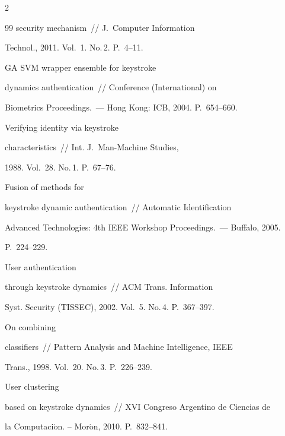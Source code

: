 \begin{multicols}{2}
{{\begin{thebibliography}{99}
security mechanism~// J.~Computer Information

Technol., 2011.  Vol.~1. No.\,2. P.~4--11.




 GA SVM  wrapper ensemble for keystroke

dynamics authentication~//  Conference (International) on

Biometrics Proceedings.~--- Hong Kong: ICB, 2004. P.~654--660.




 Verifying identity via keystroke

characteristics~// Int. J.~Man-Machine Studies,

1988. Vol.~28. No.\,1. P.~67--76.




 Fusion of methods for

keystroke dynamic authentication~// Automatic Identification

Advanced Technologies: 4th IEEE Workshop Proceedings.~--- Buffalo, 2005.

P.~224--229.




 User authentication

through keystroke dynamics~// ACM Trans. Information 

Syst. Security (TISSEC), 2002. Vol.~5. No.\,4. P.~367--397.




 On combining

classifiers~// Pattern Analysis and Machine Intelligence, IEEE

Trans., 1998. Vol.~20. No.\,3. P.~226--239.




 User clustering

based on keystroke dynamics~// XVI Congreso Argentino de Ciencias de

la Computaci$\acute{\mbox{o}}$n. -- Mor$\acute{\mbox{o}}$n, 2010. P.~832--841.




\end{thebibliography}}}
\end{multicols}
